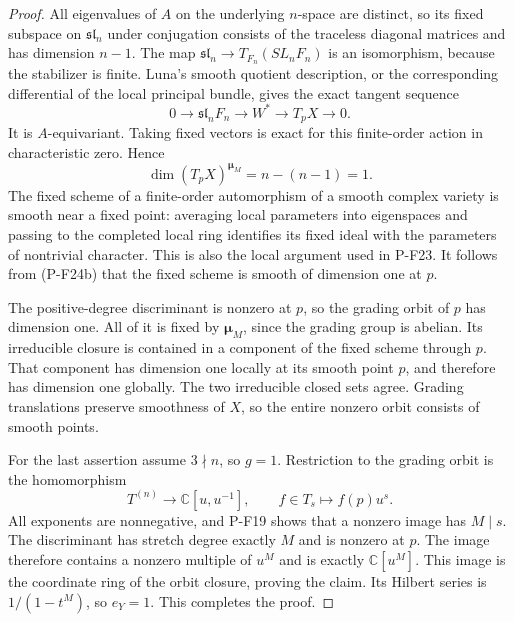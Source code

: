 \begin{proof}
All eigenvalues of $A$ on the underlying $n$-space are
distinct, so its fixed subspace on $\mathfrak{sl}_n$
under conjugation consists of the traceless diagonal
matrices and has dimension $n-1$. The map
$\mathfrak{sl}_n\to T_{F_n}(SL_nF_n)$ is an isomorphism,
because the stabilizer is finite. Luna's smooth quotient
description, or the corresponding differential of the
local principal bundle, gives the exact tangent sequence
\[
 0\longrightarrow\mathfrak{sl}_n F_n
 \longrightarrow W^*
 \longrightarrow T_pX\longrightarrow0.
\]
It is $A$-equivariant. Taking fixed vectors is exact for
this finite-order action in characteristic zero. Hence
\[
 \dim(T_pX)^{\boldsymbol\mu_M}=n-(n-1)=1.
 \tag{P-F24b}
\]
The fixed scheme of a finite-order automorphism of a
smooth complex variety is smooth near a fixed point:
averaging local parameters into eigenspaces and passing
to the completed local ring identifies its fixed ideal
with the parameters of nontrivial character. This is
also the local argument used in P-F23. It follows from
(P-F24b) that the fixed scheme is smooth of dimension one
at $p$.

The positive-degree discriminant is nonzero at $p$, so
the grading orbit of $p$ has dimension one. All of it
is fixed by $\boldsymbol\mu_M$, since the grading group
is abelian. Its irreducible closure is contained in a
component of the fixed scheme through $p$. That component
has dimension one locally at its smooth point $p$, and
therefore has dimension one globally. The two irreducible
closed sets agree. Grading translations preserve smoothness
of $X$, so the entire nonzero orbit consists of smooth
points.

For the last assertion assume $3\nmid n$, so $g=1$.
Restriction to the grading orbit is the homomorphism
\[
 T^{(n)}\longrightarrow\mathbb C[u,u^{-1}],\qquad
 f\in T_s\longmapsto f(p)u^s.
\]
All exponents are nonnegative, and P-F19 shows that a
nonzero image has $M\mid s$. The discriminant has stretch
degree exactly $M$ and is nonzero at $p$. The image therefore
contains a nonzero multiple of $u^M$ and is exactly
$\mathbb C[u^M]$. This image is the coordinate ring of
the orbit closure, proving the claim. Its Hilbert series is
$1/(1-t^M)$, so $e_Y=1$. This completes the proof.
\end{proof}

